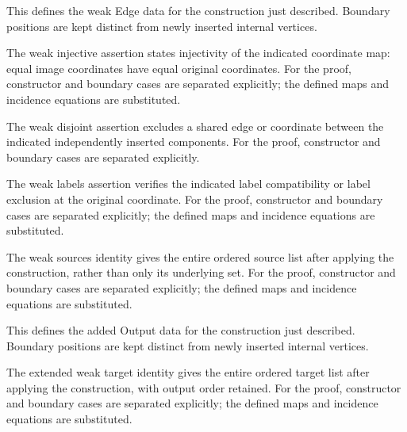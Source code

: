 This defines the weak Edge data for the construction just described. Boundary positions are kept distinct from newly inserted internal vertices.
\par{}

The weak injective assertion states injectivity of the indicated coordinate map: equal image coordinates have equal original coordinates.
For the proof, constructor and boundary cases are separated explicitly; the defined maps and incidence equations are substituted.
\par{}

The weak disjoint assertion excludes a shared edge or coordinate between the indicated independently inserted components.
For the proof, constructor and boundary cases are separated explicitly.
\par{}

The weak labels assertion verifies the indicated label compatibility or label exclusion at the original coordinate.
For the proof, constructor and boundary cases are separated explicitly; the defined maps and incidence equations are substituted.
\par{}

The weak sources identity gives the entire ordered source list after applying the construction, rather than only its underlying set.
For the proof, constructor and boundary cases are separated explicitly; the defined maps and incidence equations are substituted.
\par{}

This defines the added Output data for the construction just described. Boundary positions are kept distinct from newly inserted internal vertices.
\par{}

The extended weak target identity gives the entire ordered target list after applying the construction, with output order retained.
For the proof, constructor and boundary cases are separated explicitly; the defined maps and incidence equations are substituted.
\par{}

